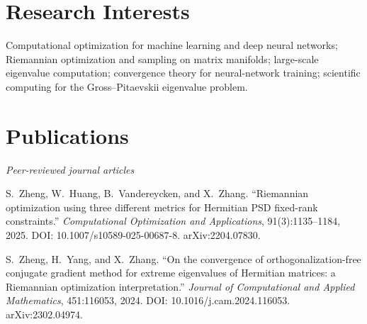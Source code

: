\documentclass[11pt]{article}
\begin{document}
\section{Research Interests}

Computational optimization for machine learning and deep neural networks; Riemannian optimization and sampling on matrix manifolds; large-scale eigenvalue computation; convergence theory for neural-network training; scientific computing for the Gross--Pitaevskii eigenvalue problem.

\section{Publications}

\textit{Peer-reviewed journal articles}
\begin{enumerate}[label={[\arabic*]}, leftmargin=1.5em, itemsep=3pt]

\item S.\ Zheng, W.\ Huang, B.\ Vandereycken, and X.\ Zhang.
``Riemannian optimization using three different metrics for Hermitian PSD fixed-rank constraints.''
\textit{Computational Optimization and Applications}, 91(3):1135--1184, 2025.
DOI: 10.1007/s10589-025-00687-8. arXiv:2204.07830.

\item S.\ Zheng, H.\ Yang, and X.\ Zhang.
``On the convergence of orthogonalization-free conjugate gradient method for extreme eigenvalues of Hermitian matrices: a Riemannian optimization interpretation.''
\textit{Journal of Computational and Applied Mathematics}, 451:116053, 2024.
DOI: 10.1016/j.cam.2024.116053. arXiv:2302.04974.

\end{enumerate}
\end{document}
